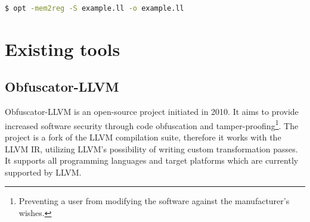 \documentclass[
  digital, %
  table,   %
  twoside, %
  nolof,     %
  nolot,     %
]{fithesis3}
\theoremstyle{definition}
\begin{document}
\begin{lstlisting}[language=bash]
$ opt -mem2reg -S example.ll -o example.ll
\end{lstlisting}

\chapter{Existing tools}

\section{Obfuscator-LLVM} \label{sec:ollvm}

Obfuscator-LLVM is an open-source project initiated in 2010. It aims to provide increased software security through code obfuscation and tamper-proofing\footnote{Preventing a user from modifying the software against the manufacturer's wishes.}. The project is a fork of the LLVM compilation suite, therefore it works with the LLVM IR, utilizing LLVM's possibility of writing custom transformation passes. It supports all programming languages and target platforms which are currently supported by LLVM. 
\end{document}
